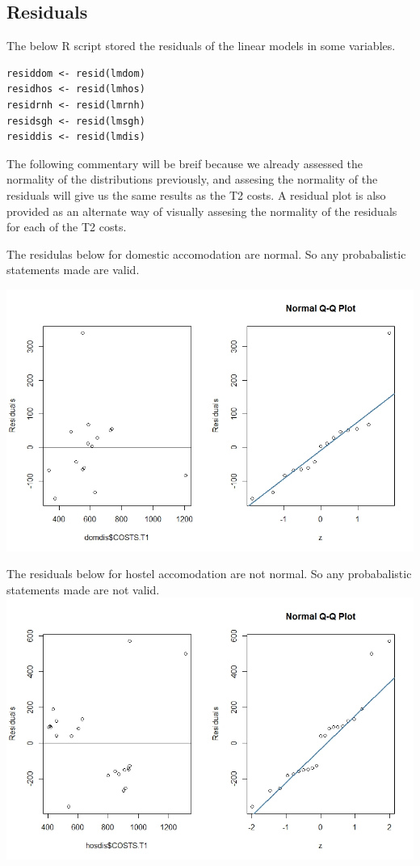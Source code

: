 \documentclass[]{article}
\begin{document}
\subsection{Residuals}
The below R script stored the residuals of the linear models in some variables.
\begin{lstlisting}
residdom <- resid(lmdom)
residhos <- resid(lmhos)
residrnh <- resid(lmrnh)
residsgh <- resid(lmsgh)
residdis <- resid(lmdis)
\end{lstlisting}
\begin{flushleft}
The following commentary will be breif because we already assessed the normality of the distributions previously, and assesing the normality of the residuals will give us the same results as the T2 costs. A residual plot is also provided as an alternate way of visually assesing the normality of the residuals for each of the T2 costs.
\end{flushleft}

The residulas below for domestic accomodation are normal. So any probabalistic statements made are valid.

\centering
\includegraphics[width=\textwidth]{RStudio/jpeg/Res_DOM.jpeg}
\raggedright

The residuals below for hostel accomodation are not normal. So any probabalistic statements made are not valid.
\centering
\includegraphics[width=\textwidth]{RStudio/jpeg/Res_HOS.jpeg}
\raggedright
\end{document}

